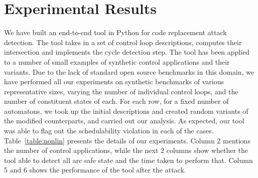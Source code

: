 \section{Experimental Results} \label{sec5}
\noindent
We have built an end-to-end tool in Python for code replacement attack detection.
The tool takes in a set of control loop descriptions, computes their intersection and 
implements the cycle detection step. The tool has been applied to a number of small 
examples of synthetic control applications and their variants. Due to the lack of standard open
source benchmarks in this domain, we have performed all our experiments on synthetic benchmarks of 
various representative sizes, varying the number of individual control loops, and the number of constituent states of each.
For each row, for a fixed number of automatons, we took up the initial descriptions and created random variants of
the modified counterparts, and carried out our analysis. As expected, our tool was able to flag out the
schedulability violation in each of the cases. Table~\ref{table:nonlin} presents the details of our experiments.
Column 2 mentions the number of control applications, 
while the next 2 columns show whether the tool able to detect all are safe state and the time taken to perform that. 
Column 5 and 6 shows the performance of the tool after the attack.

